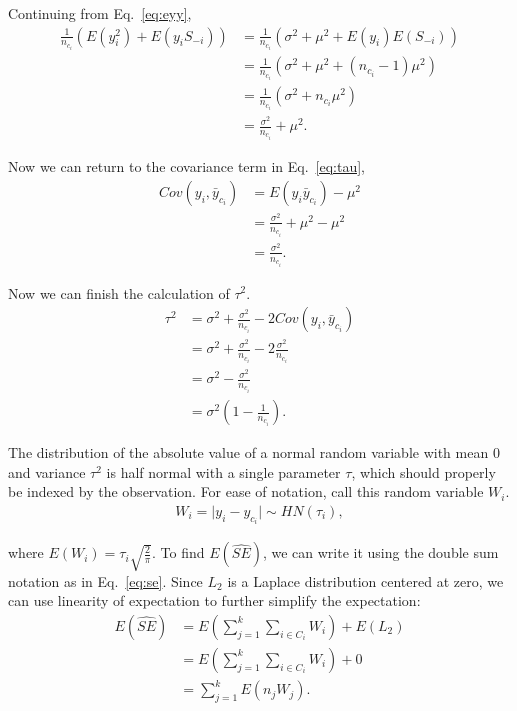 \documentclass[USenglish,oneside]{article}
\newcounter{ab}
\newcounter{ar}
\newcounter{igh}
\begin{document}
\noindent Continuing from Eq.~\eqref{eq:eyy}, 
\begin{align*}
\frac{1}{n_{c_i}}\left( E\left(y_i^2\right) + E\left(y_i S_{-i}\right)\right) &= \frac{1}{n_{c_i}}\left(\sigma^2 + \mu^2 + E(y_i)E(S_{-i})\right) \\
&= \frac{1}{n_{c_i}}\left(\sigma^2 + \mu^2 + (n_{c_i} - 1)\mu^2\right) \\
&= \frac{1}{n_{c_i}}\left(\sigma^2 + n_{c_i}\mu^2\right) \\
&= \frac{\sigma^2}{n_{c_i}} + \mu^2.
\end{align*}

\noindent Now we can return to the covariance term in Eq.~\eqref{eq:tau},
\begin{align*}
Cov(y_i, \bar{y}_{c_i}) &= E(y_i \bar{y}_{c_i}) - \mu^2 \\
&= \frac{\sigma^2}{n_{c_i}} + \mu^2 - \mu^2 \\
&= \frac{\sigma^2}{n_{c_i}}.
\end{align*}

\noindent Now we can finish the calculation of $\tau^2$.
\begin{align*}
\tau^2 &= \sigma^2 + \frac{\sigma^2}{n_{c_i}} - 2 Cov(y_i, \bar{y}_{c_i}) \\
&= \sigma^2 + \frac{\sigma^2}{n_{c_i}} - 2 \frac{\sigma^2}{n_{c_i}} \\
&= \sigma^2 - \frac{\sigma^2}{n_{c_i}} \\
&= \sigma^2\left(1 - \frac{1}{n_{c_i}}\right).
\end{align*}

The distribution of the absolute value of a normal random variable with mean 0 and variance $\tau^2$ is half normal with a single parameter $\tau$, which should properly be indexed by the observation. For ease of notation, call this random variable $W_i$.
\begin{align*}
W_i = \lvert y_i - y_{c_i}\rvert \sim HN(\tau_i),
\end{align*}

\noindent where $E(W_i) = \tau_i \sqrt{\frac{2}{\pi}}$.  To find $E(\widehat{SE})$, we can write it using the double sum notation as in Eq.~\eqref{eq:se}. Since $L_2$ is a Laplace distribution centered at zero, we can use linearity of expectation to further simplify the expectation:
\begin{align*}
E(\widehat{SE}) &= E\left(\sum_{j=1}^k \sum_{i \in C_i} W_i\right)+ E(L_2)\\
&= E\left(\sum_{j=1}^k \sum_{i \in C_i} W_i \right) + 
0\\
&= \sum_{j=1}^k E\left(n_j W_j \right).
\end{align*}
\end{document}
